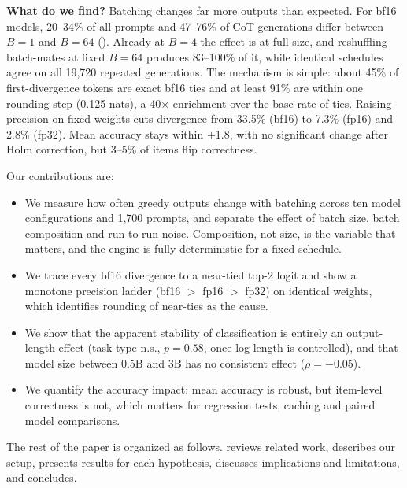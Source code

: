 {\bf What do we find?} Batching changes far more outputs than expected. For bf16 models, 20--34\% of all prompts and 47--76\% of CoT generations differ between $B=1$ and $B=64$ (). Already at $B=4$ the effect is at full size, and reshuffling batch-mates at fixed $B=64$ produces 83--100\% of it, while identical schedules agree on all 19,720 repeated generations. The mechanism is simple: about 45\% of first-divergence tokens are exact bf16 ties and at least 91\% are within one rounding step (0.125 nats), a 40$\times$ enrichment over the base rate of ties. Raising precision on fixed weights cuts divergence from 33.5\% (bf16) to 7.3\% (fp16) and 2.8\% (fp32). Mean accuracy stays within $\pm$1.8\pp, with no significant change after Holm correction, but 3--5\% of items flip correctness.

Our contributions are:
\begin{itemize}[leftmargin=*,itemsep=0pt,topsep=0pt]
    \item We measure how often greedy outputs change with batching across ten model configurations and 1,700 prompts, and separate the effect of batch size, batch composition and run-to-run noise. Composition, not size, is the variable that matters, and the engine is fully deterministic for a fixed schedule.
    \item We trace every bf16 divergence to a near-tied top-2 logit and show a monotone precision ladder (bf16 $>$ fp16 $>$ fp32) on identical weights, which identifies rounding of near-ties as the cause.
    \item We show that the apparent stability of classification is entirely an output-length effect (task type n.s., $p=0.58$, once log length is controlled), and that model size between 0.5B and 3B has no consistent effect ($\rho=-0.05$).
    \item We quantify the accuracy impact: mean accuracy is robust, but item-level correctness is not, which matters for regression tests, caching and paired model comparisons.
\end{itemize}

The rest of the paper is organized as follows.  reviews related work,  describes our setup,  presents results for each hypothesis,  discusses implications and limitations, and  concludes.
